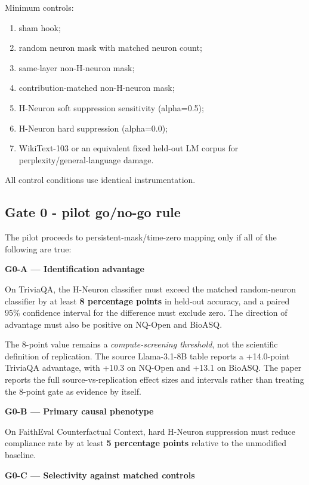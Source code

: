 Minimum controls:

\begin{enumerate}
\def\labelenumi{\arabic{enumi}.}
\tightlist
\item
  sham hook;
\item
  random neuron mask with matched neuron count;
\item
  same-layer non-H-neuron mask;
\item
  contribution-matched non-H-neuron mask;
\item
  H-Neuron soft suppression sensitivity (alpha=0.5);
\item
  H-Neuron hard suppression (alpha=0.0);
\item
  WikiText-103 or an equivalent fixed held-out LM corpus for perplexity/general-language damage.
\end{enumerate}

All control conditions use identical instrumentation.

\subsection{Gate 0 - pilot go/no-go rule}\label{gate-0---pilot-gono-go-rule}

The pilot proceeds to persistent-mask/time-zero mapping only if all of the following are true:

\textbf{G0-A --- Identification advantage}

On TriviaQA, the H-Neuron classifier must exceed the matched random-neuron classifier by at least \textbf{8 percentage points} in held-out accuracy, and a paired 95\% confidence interval for the difference must exclude zero. The direction of advantage must also be positive on NQ-Open and BioASQ.

The 8-point value remains a \emph{compute-screening threshold}, not the scientific definition of replication. The source Llama-3.1-8B table reports a +14.0-point TriviaQA advantage, with +10.3 on NQ-Open and +13.1 on BioASQ. The paper reports the full source-vs-replication effect sizes and intervals rather than treating the 8-point gate as evidence by itself.

\textbf{G0-B --- Primary causal phenotype}

On FaithEval Counterfactual Context, hard H-Neuron suppression must reduce compliance rate by at least \textbf{5 percentage points} relative to the unmodified baseline.

\textbf{G0-C --- Selectivity against matched controls}

